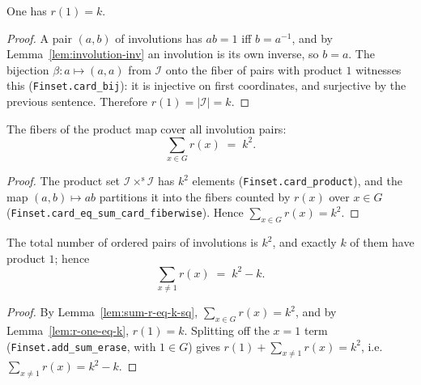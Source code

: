 \begin{lemma}
    \label{lem:r-one-eq-k}
    \leanok
    One has $r(1) = k$.
\end{lemma}
\begin{proof}
    A pair $(a,b)$ of involutions has $ab = 1$ iff $b = a^{-1}$, and by
    Lemma~\ref{lem:involution-inv} an involution is its own inverse, so $b = a$.
    The bijection $\beta : a \mapsto (a,a)$ from $\mathcal{I}$ onto the fiber of
    pairs with product $1$ witnesses this (\texttt{Finset.card\_bij}): it is
    injective on first coordinates, and surjective by the previous sentence.
    Therefore $r(1) = |\mathcal{I}| = k$.
\end{proof}

\begin{lemma}
    \label{lem:sum-r-eq-k-sq}
    \leanok
    The fibers of the product map cover all involution pairs:
    \[
        \sum_{x \in G} r(x) \;=\; k^2 .
    \]
\end{lemma}
\begin{proof}
    The product set $\mathcal{I} \times^{\mathrm s} \mathcal{I}$ has $k^2$
    elements (\texttt{Finset.card\_product}), and the map $(a,b) \mapsto ab$
    partitions it into the fibers counted by $r(x)$ over $x \in G$
    (\texttt{Finset.card\_eq\_sum\_card\_fiberwise}). Hence
    $\sum_{x \in G} r(x) = k^2$.
\end{proof}

\begin{lemma}
    \label{lem:sum-pairs}
    \leanok
    The total number of ordered pairs of involutions is $k^2$, and exactly $k$ of
    them have product $1$; hence
    \[
        \sum_{x \ne 1} r(x) \;=\; k^2 - k .
    \]
\end{lemma}
\begin{proof}
    By Lemma~\ref{lem:sum-r-eq-k-sq}, $\sum_{x \in G} r(x) = k^2$, and by
    Lemma~\ref{lem:r-one-eq-k}, $r(1) = k$. Splitting off the $x = 1$ term
    (\texttt{Finset.add\_sum\_erase}, with $1 \in G$) gives
    $r(1) + \sum_{x \ne 1} r(x) = k^2$, i.e.
    $\sum_{x \ne 1} r(x) = k^2 - k$.
\end{proof}

